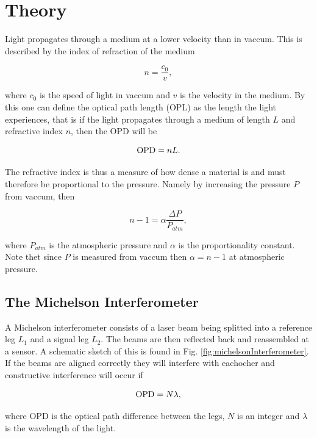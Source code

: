 \section{Theory}

Light propagates through a medium at a lower velocity than in vaccum. This is described by the index of refraction of the medium

\begin{equation}
  \label{eq:refrInd}
  n = \frac{c_0}{v},
\end{equation}

where $c_0$ is the speed of light in vaccum and $v$ is the velocity in the medium\cite{phH}. By this one can define the optical path length (OPL) as the length the light experiences, that is if the light propagates through a medium of length $L$ and refractive index $n$, then the OPD will be

\begin{equation*}
  \textnormal{OPD} = nL.
\end{equation*}

The refractive index is thus a measure of how dense a material is and must therefore be proportional to the pressure. Namely by increasing the pressure $P$ from vaccum, then

\begin{equation}
  \label{eq:refrVaccum}
  n-1 = \alpha \frac{\Delta P}{P_{atm}},
\end{equation}

where $P_{atm}$ is the atmospheric pressure and $\alpha$ is the proportionality constant. Note thet since $P$ is measured from vaccum then $\alpha=n-1$ at atmospheric pressure.

\subsection{The Michelson Interferometer}
A Michelson interferometer consists of a laser beam being splitted into a reference leg $L_1$ and a signal leg $L_2$. The beams are then reflected back and reassembled at a sensor. A schematic sketch of this is found in Fig. \ref{fig:michelsonInterferometer}. If the beams are aligned correctly they will interfere with eachocher and constructive interference will occur if

\begin{equation}
\label{eq:interference}
  \textnormal{OPD} = N \lambda,
\end{equation}

where OPD is the optical path difference between the legs, $N$ is an integer and $\lambda$ is the wavelength of the light.

